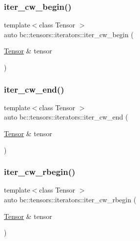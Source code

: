 \subsubsection{\texorpdfstring{iter\+\_\+cw\+\_\+begin()}{iter\_cw\_begin()}}
{\footnotesize\ttfamily template$<$class Tensor $>$ \\
auto bc\+::tensors\+::iterators\+::iter\+\_\+cw\+\_\+begin (\begin{DoxyParamCaption}\item[{\hyperlink{namespacebc_a659391e47ab612be3ba6c18cf9c89159}{Tensor} \&}]{tensor }\end{DoxyParamCaption})}

\mbox{\label{namespacebc_1_1tensors_1_1iterators_a27bc0ad8dd49827fd98426df362798d5}} 
\subsubsection{\texorpdfstring{iter\+\_\+cw\+\_\+end()}{iter\_cw\_end()}}
{\footnotesize\ttfamily template$<$class Tensor $>$ \\
auto bc\+::tensors\+::iterators\+::iter\+\_\+cw\+\_\+end (\begin{DoxyParamCaption}\item[{\hyperlink{namespacebc_a659391e47ab612be3ba6c18cf9c89159}{Tensor} \&}]{tensor }\end{DoxyParamCaption})}

\mbox{\label{namespacebc_1_1tensors_1_1iterators_a53c8943b4ce77f69fe9ac2e7c27c1536}} 
\subsubsection{\texorpdfstring{iter\+\_\+cw\+\_\+rbegin()}{iter\_cw\_rbegin()}}
{\footnotesize\ttfamily template$<$class Tensor $>$ \\
auto bc\+::tensors\+::iterators\+::iter\+\_\+cw\+\_\+rbegin (\begin{DoxyParamCaption}\item[{\hyperlink{namespacebc_a659391e47ab612be3ba6c18cf9c89159}{Tensor} \&}]{tensor }\end{DoxyParamCaption})}

